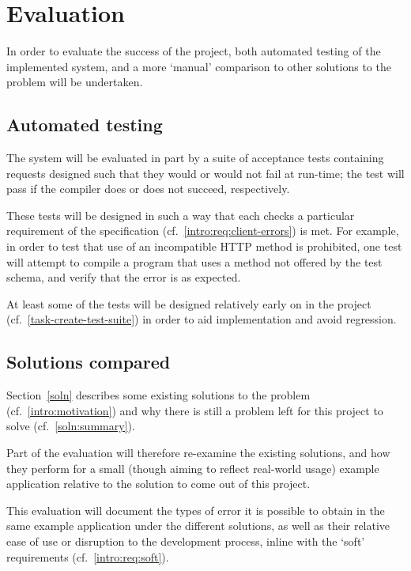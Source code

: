 \section{Evaluation}\label{eval}

In order to evaluate the success of the project, both automated testing of the implemented system, and a more `manual' comparison to other solutions to the problem will be undertaken.

\subsection{Automated testing}\label{eval:auto-test}
The system will be evaluated in part by a suite of acceptance tests containing requests designed such that they would or would not fail at run-time; the test will pass if the compiler does or does not succeed, respectively.

These tests will be designed in such a way that each checks a particular requirement of the specification (cf.~\ref{intro:req:client-errors}) is met. For example,  in order to test that use of an incompatible HTTP method is prohibited, one test will attempt to compile a program that uses a method not offered by the test schema, and verify that the error is as expected.

At least some of the tests will be designed relatively early on in the project (cf.~\ref{task-create-test-suite}) in order to aid implementation and avoid regression.

\subsection{Solutions compared}\label{soln:comparison}
Section~\ref{soln} describes some existing solutions to the problem (cf.~\ref{intro:motivation}) and why there is still a problem left for this project to solve (cf.~\ref{soln:summary}).

Part of the evaluation will therefore re-examine the existing solutions, and how they perform for a small (though aiming to reflect real-world usage) example application relative to the solution to come out of this project.

This evaluation will document the types of error it is possible to obtain in the same example application under the different solutions, as well as their relative ease of use or disruption to the development process, inline with the `soft' requirements (cf.~\ref{intro:req:soft}).
